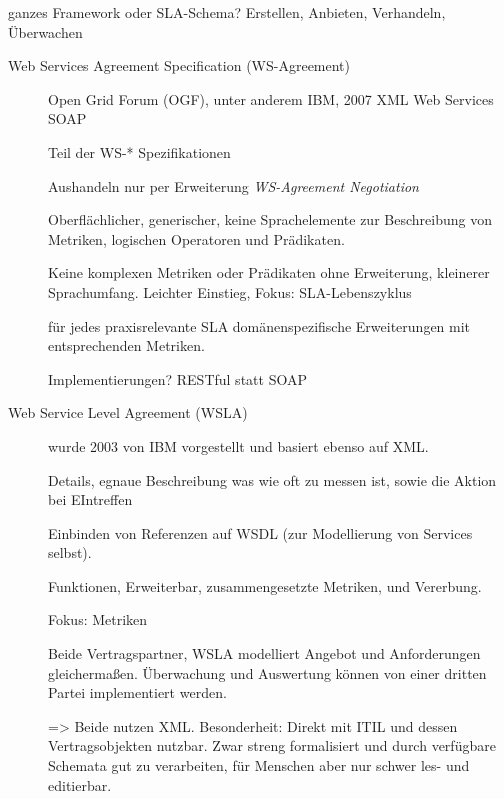 ganzes Framework oder SLA-Schema?
Erstellen, Anbieten, Verhandeln, Überwachen

\begin{description}
	\item[Web Services Agreement Specification (WS-Agreement)]
	Open Grid Forum (OGF), unter anderem IBM,  2007
	XML
	Web Services SOAP
	
	Teil der WS-* Spezifikationen
	
	Aushandeln nur per Erweiterung \emph{WS-Agreement Negotiation}
	
	Oberflächlicher, generischer, keine Sprachelemente zur Beschreibung von Metriken, logischen Operatoren und Prädikaten.
	
	Keine komplexen Metriken oder Prädikaten ohne Erweiterung, kleinerer Sprachumfang. Leichter Einstieg, Fokus: SLA-Lebenszyklus
	
	für jedes praxisrelevante SLA domänenspezifische Erweiterungen mit entsprechenden Metriken.

	
	
	Implementierungen?	
	RESTful statt SOAP
	
	\item[Web Service Level Agreement (WSLA)] wurde 2003 von IBM vorgestellt und basiert ebenso auf XML. 
	
	Details, egnaue Beschreibung was wie oft zu messen ist, sowie die Aktion bei EIntreffen
	
	Einbinden von Referenzen auf WSDL (zur Modellierung von Services selbst).
	
	Funktionen, Erweiterbar, zusammengesetzte Metriken, und Vererbung.
	
	Fokus: Metriken
	
	Beide Vertragspartner, WSLA modelliert Angebot und Anforderungen gleichermaßen. Überwachung und Auswertung können von einer dritten Partei implementiert werden.
	
		

=> Beide nutzen XML. Besonderheit: Direkt mit ITIL und dessen Vertragsobjekten nutzbar.
 Zwar streng formalisiert und durch verfügbare Schemata gut zu verarbeiten, für Menschen aber nur schwer les- und editierbar.



\end{description}
